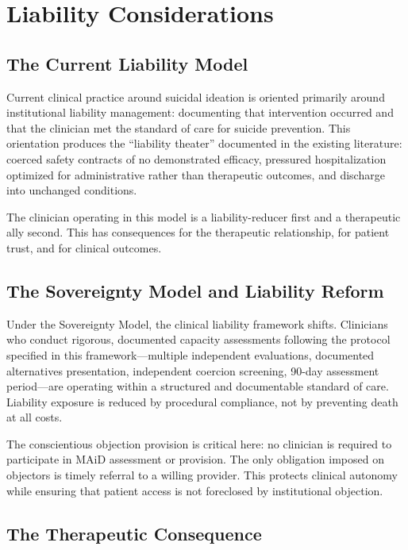 \documentclass[11pt, letterpaper]{article}
\begin{document}
\section{Liability Considerations}

\subsection{The Current Liability Model}

Current clinical practice around suicidal ideation is oriented primarily around
institutional liability management: documenting that intervention occurred and that the
clinician met the standard of care for suicide prevention. This orientation produces
the ``liability theater'' documented in the existing literature: coerced safety
contracts of no demonstrated efficacy, pressured hospitalization optimized for
administrative rather than therapeutic outcomes, and discharge into unchanged conditions.

The clinician operating in this model is a liability-reducer first and a therapeutic
ally second. This has consequences for the therapeutic relationship, for patient trust,
and for clinical outcomes.

\subsection{The Sovereignty Model and Liability Reform}

Under the Sovereignty Model, the clinical liability framework shifts. Clinicians who
conduct rigorous, documented capacity assessments following the protocol specified in
this framework---multiple independent evaluations, documented alternatives presentation,
independent coercion screening, 90-day assessment period---are operating within a
structured and documentable standard of care. Liability exposure is reduced by
procedural compliance, not by preventing death at all costs.

The conscientious objection provision is critical here: no clinician is required to
participate in MAiD assessment or provision. The only obligation imposed on objectors
is timely referral to a willing provider. This protects clinical autonomy while
ensuring that patient access is not foreclosed by institutional objection.

\subsection{The Therapeutic Consequence}
\end{document}
